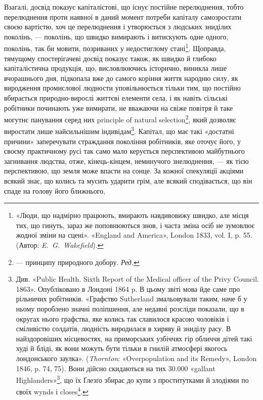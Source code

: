 Взагалі, досвід показує капіталістові, що існує постійне
перелюднення, тобто перелюднення проти наявної в даний момент
потреби капіталу самозростати своєю вартістю, хоч це перелюднення
і утворюється з людських зниділих поколінь, — поколінь,
що швидко вимирають і витискують одне одного, поколінь, так
би мовити, позриваних у недостиглому стані\footnote{
«Люди, що надмірно працюють, вмирають навдивовижу швидко,
але місця тих, що гинуть, зараз же поповнюються знов, і часта зміна
осіб не зумовлює жодної зміни на сцені». «England and America»,
London 1833, vol. I, p. 55. (Автор: \emph{E.~G.~Wakefield}).
}. Щоправда,
тямущому спостерігачеві досвід показує також, як швидко
й глибоко капіталістична продукція, що, висловлюючись історично,
виникла лише вчорашнього дня, підкопала вже до
самого коріння життя народню силу, як виродження промислової
людности уповільнюється тільки тим, що постійно вбирається
природно-вирослі життєві елементи села, і як навіть сільські
робітники починають уже вимирати, не вважаючи на свіже повітря
й таке могутнє панування серед них principle of natural selection\footnote*{
— принципу природного добору. \emph{Ред.}
},
який дозволяє виростати лише найсильнішим індивідам\footnote{
Див. «Public Health. Sixth Report of the Medical officer of the
Privy Council. 1863». Опубліковано в Лондоні 1864 p. В цьому звіті
мова йде саме про рільничих робітників. «Графство Sutherland змальовували
таким, наче б у ньому пороблено значні поліпшення, але недавні
розсліди показали, що в округах нього графства, яке колись так славилося
красою чоловіків і сміливістю солдатів, людність виродилася в
хиряву й зниділу расу. В найздоровіших місцевостях, на приморських
узбіччях гір обличчя дітей такі худі й бліді, як вони можуть бути
тільки в гнилій атмосфері якогось лондонського заулка». (\emph{Thornton}:
«Overpopulation and its Remedy», London 1846, p. 74, 75). Вони дійсно
скидаються на тих \num{30.000} «gallant Highlanders»\footnote*{
— бравих горян. \emph{Ред.}
}, що їх Ґлезґо збирає
до купи з проститутками й злодіями по своїх wynds і closes\footnote*{
— заулках і вертепах. \emph{Ред.}
}.
}.
Капітал, що має такі «достатні причини» заперечувати страждання
покоління робітників, яке оточує його, у своєму практичному
русі так само мало керується перспективою майбутнього загнивання
людства, отже, кінець-кінцем, неминучого знелюднення, —
як тією перспективою, що земля може впасти на сонце. За кожної
спекуляції акціями всякий знає, що колись та мусить ударити
грім, але всякий сподівається, що він спаде на голову його ближнього,
